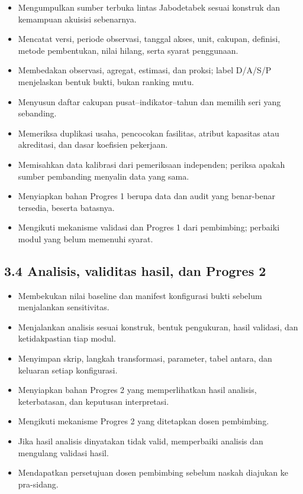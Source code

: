 \documentclass[
  indonesian,
  11pt,
]{article}
\providecommand{\tightlist}{%
  \setlength{\itemsep}{0pt}\setlength{\parskip}{0pt}}
\renewcommand{\tightlist}{%
  \setlength{\itemsep}{0.22em}%
  \setlength{\parskip}{0pt}%
}
\begin{document}
\begin{itemize}
\tightlist
\item[$\square$]
  Mengumpulkan sumber terbuka lintas Jabodetabek sesuai konstruk dan
  kemampuan akuisisi sebenarnya.
\item[$\square$]
  Mencatat versi, periode observasi, tanggal akses, unit, cakupan,
  definisi, metode pembentukan, nilai hilang, serta syarat penggunaan.
\item[$\square$]
  Membedakan observasi, agregat, estimasi, dan proksi; label D/A/S/P
  menjelaskan bentuk bukti, bukan ranking mutu.
\item[$\square$]
  Menyusun daftar cakupan pusat--indikator--tahun dan memilih seri yang
  sebanding.
\item[$\square$]
  Memeriksa duplikasi usaha, pencocokan fasilitas, atribut kapasitas
  atau akreditasi, dan dasar koefisien pekerjaan.
\item[$\square$]
  Memisahkan data kalibrasi dari pemeriksaan independen; periksa apakah
  sumber pembanding menyalin data yang sama.
\item[$\square$]
  Menyiapkan bahan Progres 1 berupa data dan audit yang benar-benar
  tersedia, beserta batasnya.
\item[$\square$]
  Mengikuti mekanisme validasi dan Progres 1 dari pembimbing; perbaiki
  modul yang belum memenuhi syarat.
\end{itemize}

\subsection{3.4 Analisis, validitas hasil, dan Progres
2}\label{analisis-validitas-hasil-dan-progres-2}

\begin{itemize}
\tightlist
\item[$\square$]
  Membekukan nilai baseline dan manifest konfigurasi bukti sebelum
  menjalankan sensitivitas.
\item[$\square$]
  Menjalankan analisis sesuai konstruk, bentuk pengukuran, hasil
  validasi, dan ketidakpastian tiap modul.
\item[$\square$]
  Menyimpan skrip, langkah transformasi, parameter, tabel antara, dan
  keluaran setiap konfigurasi.
\item[$\square$]
  Menyiapkan bahan Progres 2 yang memperlihatkan hasil analisis,
  keterbatasan, dan keputusan interpretasi.
\item[$\square$]
  Mengikuti mekanisme Progres 2 yang ditetapkan dosen pembimbing.
\item[$\square$]
  Jika hasil analisis dinyatakan tidak valid, memperbaiki analisis dan
  mengulang validasi hasil.
\item[$\square$]
  Mendapatkan persetujuan dosen pembimbing sebelum naskah diajukan ke
  pra-sidang.
\end{itemize}
\end{document}
